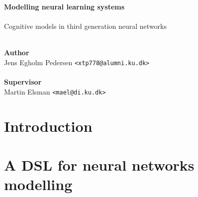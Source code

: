 \documentclass[a4paper,oneside]{memoir}
\begin{document}
\newcommand{\obar}{%
    \mathrel{\reflectbox{\rotatebox[origin=c]{90}{$\ominus$}}}}

    \thispagestyle{empty}
    \begin{adjustwidth}{-3cm}{-1.5cm}
      \vspace*{1cm}
      \textbf{\Huge Modelling neural learning systems} \\
      \\[0.5cm]
      \vspace*{1cm}
      {\huge Cognitive models in third generation neural networks}\\
      \begin{tabbing}
      \\
      \textbf{\Large Author} \\
      Jens Egholm Pedersen \hspace{1cm} \= \texttt{<xtp778@alumni.ku.dk>} \\
      \\[13cm]
      \textbf{\Large Supervisor} \\
      Martin Elsman \hspace{1cm} \= \texttt{<mael@di.ku.dk>}
      \end{tabbing}
    \end{adjustwidth}

    \newpage

    \ClearWallPaper

\renewcommand\cftchapteraftersnumb{\normalfont}
\renewcommand\cftbeforechapterskip{5pt plus 1pt}

\frontmatter
\setcounter{tocdepth}{2}
\tableofcontents*
\newpage

\mainmatter
\chapter{Introduction} \label{sec:intro}
  

\chapter{A DSL for neural networks modelling} \label{sec:volr}
  
\end{document}
